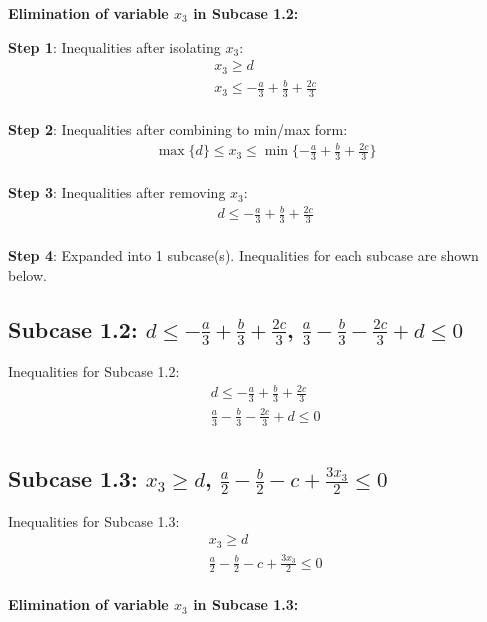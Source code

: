 \documentclass{article}
\begin{document}
\textbf{Elimination of variable $x_{3}$ in Subcase 1.2:}

\textbf{Step 1}: Inequalities after isolating $x_{3}$:
\begin{align}
& x_{3} \geq d \\
& x_{3} \leq - \frac{a}{3} + \frac{b}{3} + \frac{2 c}{3} \\
\end{align}

\textbf{Step 2}: Inequalities after combining to min/max form:
\begin{align}
& \max\{d\} \leq x_{3} \leq \min\{- \frac{a}{3} + \frac{b}{3} + \frac{2 c}{3}\} \\
\end{align}

\textbf{Step 3}: Inequalities after removing $x_{3}$:
\begin{align}
& d \leq - \frac{a}{3} + \frac{b}{3} + \frac{2 c}{3} \\
\end{align}

\textbf{Step 4}: Expanded into 1 subcase(s). Inequalities for each subcase are shown below.

\subsection{Subcase 1.2: $d \leq - \frac{a}{3} + \frac{b}{3} + \frac{2 c}{3}$, $\frac{a}{3} - \frac{b}{3} - \frac{2 c}{3} + d \leq 0$}

Inequalities for Subcase 1.2:
\begin{align}
& d \leq - \frac{a}{3} + \frac{b}{3} + \frac{2 c}{3} \\
& \frac{a}{3} - \frac{b}{3} - \frac{2 c}{3} + d \leq 0 \\
\end{align}

\subsection{Subcase 1.3: $x_{3} \geq d$, $\frac{a}{2} - \frac{b}{2} - c + \frac{3 x_{3}}{2} \leq 0$}

Inequalities for Subcase 1.3:
\begin{align}
& x_{3} \geq d \\
& \frac{a}{2} - \frac{b}{2} - c + \frac{3 x_{3}}{2} \leq 0 \\
\end{align}

\textbf{Elimination of variable $x_{3}$ in Subcase 1.3:}
\end{document}
